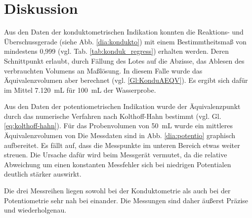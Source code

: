 \newpage
\section{Diskussion}
\label{sec:diskussion}

Aus den  Daten der konduktometrischen Indikation konnten die Reaktions- und Überschussgerade (siehe Abb. \ref{dia:kondukto}) mit einem Bestimmtheitsmaß von mindestens 0,999 (vgl. Tab. \ref{tab:konduk_regress}) erhalten werden. Deren Schnittpunkt erlaubt, durch Fällung des Lotes auf die Abzisse, das Ablesen des verbrauchten Volumens an Maßlösung. In diesem Falle wurde das Äquivalenzvolumen aber berechnet (vgl. \eqref{Gl:KonduAEQV}). Es ergibt sich dafür im Mittel \SI{7,120}{\milli\liter} für \SI{100}{\milli\liter} der Wasserprobe. 

Aus den Daten der potentiometrischen Indikation wurde der Äquivalenzpunkt durch das numerische Verfahren nach Kolthoff-Hahn bestimmt (vgl. Gl. \eqref{eq:kolthoff-hahn}). Für das Probenvolumen von \SI{50}{\milli\liter} wurde ein mittleres Äquivalenzvolumen von  Die Messdaten sind in Abb. \ref{dia:potentio} graphisch aufbereitet. Es fällt auf, dass die Messpunkte im unteren Bereich etwas weiter streuen. Die Ursache dafür wird beim Messgerät vermutet, da die relative Abweichung um einen konstanten Messfehler sich bei niedrigen Potentialen deutlich stärker auswirkt. 

Die drei Messreihen liegen sowohl bei der Konduktometrie als auch bei der Potentiometrie sehr nah bei einander. Die Messungen sind daher äußerst Präzise und wiederholgenau.